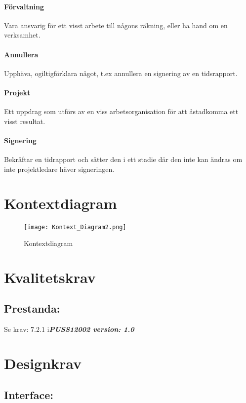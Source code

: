 \documentclass[paper=a4, fontsize=11pt,twoside]{article}
\begin{document}
\paragraph{Förvaltning}
\flushleft
Vara ansvarig för ett visst arbete till någons räkning, eller ha hand om en verksamhet.
\paragraph{Annullera}
\flushleft
Upphäva, ogiltigförklara något, t.ex annullera en signering av en tidsrapport.
\paragraph{Projekt}
\flushleft
Ett uppdrag som utförs av en viss arbetsorganisation för att åstadkomma ett visst resultat. 
\paragraph{Signering}
\flushleft
Bekräftar en tidrapport och sätter den i ett stadie där den inte kan ändras om inte projektledare häver signeringen.

\section{Kontextdiagram}
\begin{figure}[H]
\centering
\texttt{[image: Kontext\_Diagram2.png]} 
\caption{Kontextdiagram}
\end{figure}


\section{Kvalitetskrav}
\subsection{Prestanda:}
Se krav: 7.2.1 i\textbf{\textit{PUSS12002 version: 1.0}}


\section{Designkrav}
\subsection{Interface:}
\end{document}
